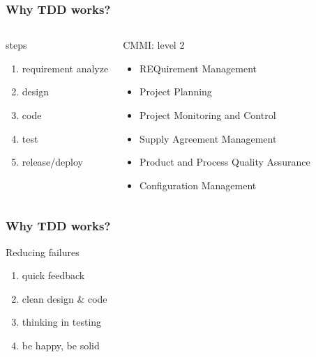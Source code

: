 \documentclass[lualatex]{beamer}
\begin{document}
\begin{frame}
    \frametitle{Why TDD works?}

    \begin{columns}[t]
        \begin{block}{steps}
        \begin{enumerate}
        \item
            requirement analyze
        \item 
            design
        \item 
            code
        \item 
            test
        \item 
            release/deploy
        \end{enumerate}
        \end{block}

        \begin{block}{CMMI: level 2}
            \begin{itemize}
                \item REQuirement Management
                \item Project Planning
                \item Project Monitoring and Control
                \item Supply Agreement Management 
                \item Product and Process Quality Assurance
                \item Configuration Management 
            \end{itemize}
        \end{block}
    \end{columns}

\end{frame}

\begin{frame}
    \frametitle{Why TDD works?}

    \begin{block}{Reducing failures}
    \begin{enumerate}
        \item
            quick feedback
        \item 
            clean design \& code
        \item 
            thinking in testing
        \item 
            be happy, be solid
    \end{enumerate}
    \end{block}

\end{frame}
\end{document}
